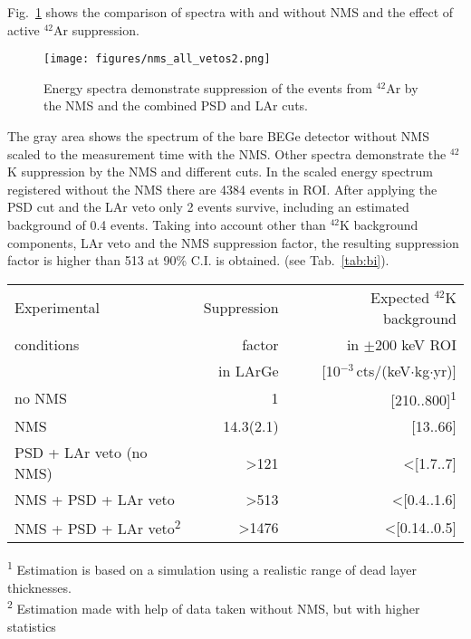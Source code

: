 \documentclass[twocolumn,epjc3]{svjour3}
\newcommand{\ctsper} {{cts/(keV\(\cdot\)kg\(\cdot\)yr)}}
\newcommand{\Gerda} {{\textsc{Gerda}\xspace}}
\newcommand{\LArGe} {{{LArGe}\xspace}}
\newcommand{\I}[2]{$^{#1}$#2}
\newcommand{\ts}{\textsuperscript}
\begin{document}
Fig.~\ref{fig:all_veto} shows the comparison of spectra with and without NMS and the effect of active \I{42}{Ar} suppression. 
%
\begin{figure}
  \begin{center}
    \texttt{[image: figures/nms\_all\_vetos2.png]}
    \caption{\label{fig:all_veto} Energy spectra demonstrate suppression of the events from \I{42}{Ar} by the NMS and the combined PSD and LAr cuts.}
  \end{center}
\end{figure}
%
The gray area shows the spectrum of the bare BEGe detector without NMS scaled to the measurement time with the NMS. Other spectra demonstrate the \I{42}{K} suppression by the NMS and different cuts. In the scaled energy spectrum registered without the NMS there are 4384 events in ROI. After applying the PSD cut and the LAr veto only 2 events survive, including an estimated background of 0.4 events. Taking into account other than \I{42}{K} background components, LAr veto and the NMS suppression factor, the resulting suppression factor is higher than 513 at 90\% C.I. is obtained. (see Tab.~\ref{tab:bi}). 
\begin{table*}
  \begin{center}
  \caption{\label{tab:bi}Suppression factors in \LArGe{} and expected \I{42}{K} background rate in \Gerda{}~Phase~II like setup before and after applying the LAr veto and PSD cuts.}
\begin{tabular}{lrr}
\toprule
Experimental & Suppression & Expected \I{42}{K} background \\
conditions  & factor & in $\pm$200 keV ROI\\
  & in \LArGe{}  & [10$^{-3}$\,\ctsper] \\
\hline
no NMS  & 1& [210..800]\ts{1}\\
NMS &  14.3(2.1) & [13..66]\\
PSD + LAr veto (no NMS) & \textgreater{121} & \textless{[1.7..7]}\\
NMS + PSD + LAr veto &\textgreater{513} & \textless{[0.4..1.6]}\\  
NMS + PSD + LAr veto\ts{2} &\textgreater{1476} & \textless{[0.14..0.5]}\\  
\bottomrule
\end{tabular}
  \end{center}
{\footnotesize
\ts{1} Estimation is based on a simulation using a realistic range of dead layer thicknesses.\\
\ts{2} Estimation made with help of data taken without NMS, but with higher statistics}
\end{table*}
\end{document}
